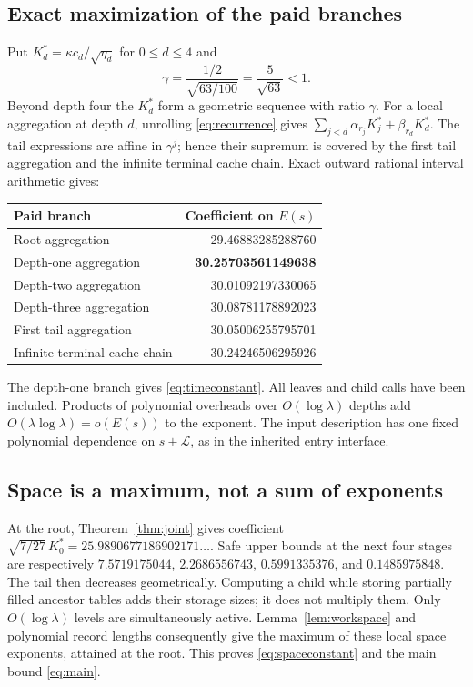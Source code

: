\documentclass[11pt]{article}
\theoremstyle{definition}\newtheorem{definition}[theorem]{Definition}
\theoremstyle{remark}\newtheorem{remark}[theorem]{Remark}
\newcommand{\CS}{25.9890677186902171\ldots}
\begin{document}
\subsection{Exact maximization of the paid branches}
Put $K_d^*=\kappa c_d/\sqrt{\eta_d}$ for $0\le d\le4$ and
\[
 \gamma=\frac{1/2}{\sqrt{63/100}}=\frac5{\sqrt{63}}<1.
\]
Beyond depth four the $K_d^*$ form a geometric sequence with ratio
$\gamma$. For a local aggregation at depth $d$, unrolling
\eqref{eq:recurrence} gives
$\sum_{j<d}\alpha_{r_j}K_j^*+\beta_{r_d}K_d^*$.
The tail expressions are affine in $\gamma^j$; hence their supremum is
covered by the first tail aggregation and the infinite terminal cache
chain. Exact outward rational interval arithmetic gives:
\begin{center}
\begin{tabular}{lr}
\toprule Paid branch & Coefficient on $E(s)$\\\midrule
Root aggregation &29.46883285288760\\
Depth-one aggregation &\textbf{30.25703561149638}\\
Depth-two aggregation &30.01092197330065\\
Depth-three aggregation &30.08781178892023\\
First tail aggregation &30.05006255795701\\
Infinite terminal cache chain &30.24246506295926\\\bottomrule
\end{tabular}
\end{center}
The depth-one branch gives \eqref{eq:timeconstant}. All leaves and child
calls have been included. Products of polynomial overheads over
$O(\log\lambda)$ depths add $O(\lambda\log\lambda)=o(E(s))$ to the
exponent. The input description has one fixed polynomial dependence on
$s+\mathcal L$, as in the inherited entry interface.

\subsection{Space is a maximum, not a sum of exponents}
At the root, Theorem~\ref{thm:joint} gives coefficient
$\sqrt{7/27}\,K_0^*=\CS$.
Safe upper bounds at the next four stages are respectively
$7.5719175044$, $2.2686556743$, $0.5991335376$, and $0.1485975848$.
The tail then decreases geometrically. Computing a child while storing
partially filled ancestor tables adds their storage sizes; it does not
multiply them. Only $O(\log\lambda)$ levels are simultaneously active.
Lemma~\ref{lem:workspace} and polynomial record lengths consequently give
the maximum of these local space exponents, attained at the root.
This proves \eqref{eq:spaceconstant} and the main bound \eqref{eq:main}.
\end{document}
